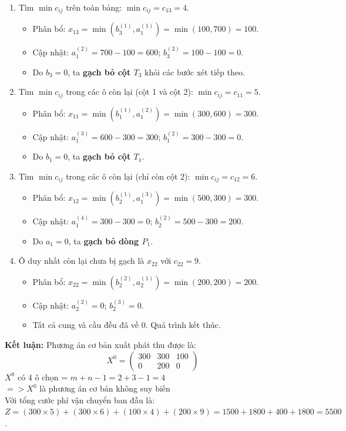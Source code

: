 \begin{enumerate}
    \item Tìm $\min c_{ij}$ trên toàn bảng: $\min c_{ij} = c_{13} = 4$.
    \begin{itemize}
        \item Phân bổ: $x_{13} = \min(b_3^{(1)}, a_1^{(1)}) = \min(100, 700) = 100$.
        \item Cập nhật: $a_1^{(2)} = 700 - 100 = 600$; $b_3^{(2)} = 100 - 100 = 0$.
        \item Do $b_3 = 0$, ta \textbf{gạch bỏ cột $T_3$} khỏi các bước xét tiếp theo.
    \end{itemize}
    
    \item Tìm $\min c_{ij}$ trong các ô còn lại (cột 1 và cột 2): $\min c_{ij} = c_{11} = 5$.
    \begin{itemize}
        \item Phân bổ: $x_{11} = \min(b_1^{(1)}, a_1^{(2)}) = \min(300, 600) = 300$.
        \item Cập nhật: $a_1^{(3)} = 600 - 300 = 300$; $b_1^{(2)} = 300 - 300 = 0$.
        \item Do $b_1 = 0$, ta \textbf{gạch bỏ cột $T_1$}.
    \end{itemize}
    
    \item Tìm $\min c_{ij}$ trong các ô còn lại (chỉ còn cột 2): $\min c_{ij} = c_{12} = 6$.
    \begin{itemize}
        \item Phân bổ: $x_{12} = \min(b_2^{(1)}, a_1^{(3)}) = \min(500, 300) = 300$.
        \item Cập nhật: $a_1^{(4)} = 300 - 300 = 0$; $b_2^{(2)} = 500 - 300 = 200$.
        \item Do $a_1 = 0$, ta \textbf{gạch bỏ dòng $P_1$}.
    \end{itemize}
    
    \item Ô duy nhất còn lại chưa bị gạch là $x_{22}$ với $c_{22} = 9$.
    \begin{itemize}
        \item Phân bổ: $x_{22} = \min(b_2^{(2)}, a_2^{(1)}) = \min(200, 200) = 200$.
        \item Cập nhật: $a_2^{(2)} = 0$; $b_2^{(3)} = 0$.
        \item Tất cả cung và cầu đều đã về 0. Quá trình kết thúc.
    \end{itemize}
\end{enumerate}

\textbf{Kết luận:} Phương án cơ bản xuất phát thu được là:
\[ X^0 = \begin{pmatrix} 300 & 300 & 100 \\ 0 & 200 & 0 \end{pmatrix} \]
$X^0$ có 4 ô chọn = $m + n - 1 = 2 + 3 - 1 = 4$ \\
$=> X^0$ là phương án cơ bản không suy biến \\
Với tổng cước phí vận chuyển ban đầu là: 
$Z = (300 \times 5) + (300 \times 6) + (100 \times 4) + (200 \times 9) = 1500 + 1800 + 400 + 1800 = 5500$.